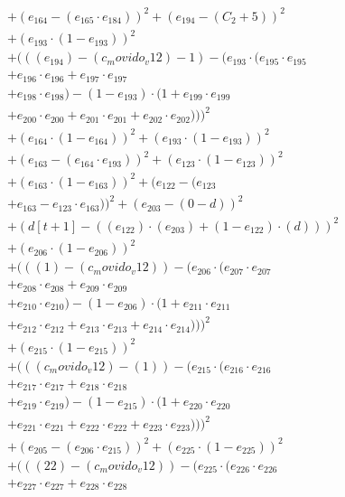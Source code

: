 \documentclass[10pt, a4paper]{article}
\begin{document}
\begin{align*}
& + (e_{164} - (e_{165} \cdot e_{184}))^{2} + (e_{194} - (C_{2} + 5))^{2} \\
& + (e_{193} \cdot (1 - e_{193}))^{2} \\
& + (((e_{194}) - (c_movido_v12) - 1) - (e_{193} \cdot (e_{195} \cdot e_{195} \\
& + e_{196} \cdot e_{196} + e_{197} \cdot e_{197} \\
& + e_{198} \cdot e_{198}) - (1 - e_{193}) \cdot (1 + e_{199} \cdot e_{199} \\
& + e_{200} \cdot e_{200} + e_{201} \cdot e_{201} + e_{202} \cdot e_{202})))^{2} \\
& + (e_{164} \cdot (1 - e_{164}))^{2} + (e_{193} \cdot (1 - e_{193}))^{2} \\
& + (e_{163} - (e_{164} \cdot e_{193}))^{2} + (e_{123} \cdot (1 - e_{123}))^{2} \\
& + (e_{163} \cdot (1 - e_{163}))^{2} + (e_{122} - (e_{123} \\
& + e_{163} - e_{123} \cdot e_{163}))^{2} + (e_{203} - (0 - d))^{2} \\
& + (d[t+1] - ((e_{122})  \cdot  (e_{203}) + (1 - e_{122})  \cdot  (d)))^{2} \\
& + (e_{206} \cdot (1 - e_{206}))^{2} \\
& + (((1) - (c_movido_v12)) - (e_{206} \cdot (e_{207} \cdot e_{207} \\
& + e_{208} \cdot e_{208} + e_{209} \cdot e_{209} \\
& + e_{210} \cdot e_{210}) - (1 - e_{206}) \cdot (1 + e_{211} \cdot e_{211} \\
& + e_{212} \cdot e_{212} + e_{213} \cdot e_{213} + e_{214} \cdot e_{214})))^{2} \\
& + (e_{215} \cdot (1 - e_{215}))^{2} \\
& + (((c_movido_v12) - (1)) - (e_{215} \cdot (e_{216} \cdot e_{216} \\
& + e_{217} \cdot e_{217} + e_{218} \cdot e_{218} \\
& + e_{219} \cdot e_{219}) - (1 - e_{215}) \cdot (1 + e_{220} \cdot e_{220} \\
& + e_{221} \cdot e_{221} + e_{222} \cdot e_{222} + e_{223} \cdot e_{223})))^{2} \\
& + (e_{205} - (e_{206} \cdot e_{215}))^{2} + (e_{225} \cdot (1 - e_{225}))^{2} \\
& + (((22) - (c_movido_v12)) - (e_{225} \cdot (e_{226} \cdot e_{226} \\
& + e_{227} \cdot e_{227} + e_{228} \cdot e_{228} \\

\end{align*}
\end{document}
